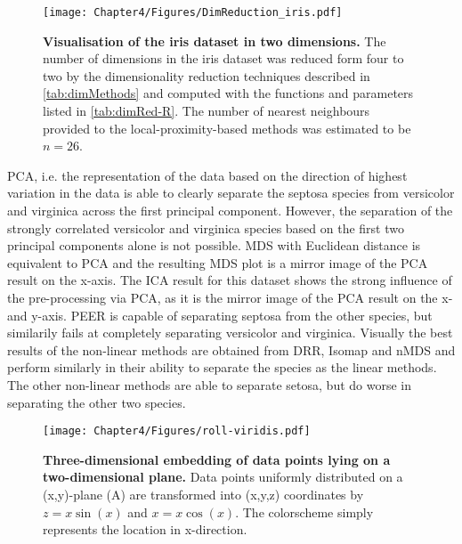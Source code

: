 \begin{figure}[h!]
	\centering
	\texttt{[image: Chapter4/Figures/DimReduction\_iris.pdf]}
	\caption[\textbf{Visualisation of the iris dataset in two dimensions.}]{\textbf{Visualisation of the iris dataset in two dimensions.} The number of dimensions in the iris dataset was reduced form four to two by the dimensionality reduction techniques described in \cref{tab:dimMethods} and computed with the functions and parameters listed in \cref{tab:dimRed-R}. The number of nearest neighbours provided to the local-proximity-based methods was estimated to be \(n=26\).} 
	 	\label{fig:dimRed-iris}
\end{figure}

PCA, i.e. the representation of the data based on the direction of highest variation in the data is able to clearly separate the septosa species from versicolor and virginica across the first principal component. However, the separation of the strongly correlated versicolor and virginica species based on the first two principal components alone is not possible. MDS with Euclidean distance is equivalent to PCA and the resulting MDS plot is a mirror image of the PCA result on the x-axis. The ICA result for this dataset shows the strong influence of the pre-processing via PCA, as it is the mirror image of the PCA result on the x- and y-axis. PEER is capable of separating septosa from the other species, but similarily fails at completely separating versicolor and virginica. 
Visually the best results of the non-linear methods are obtained from DRR, Isomap and nMDS and perform similarly in their ability to separate the species as the linear methods. The other non-linear methods are able to separate setosa, but do worse in separating the other two species.


\begin{figure}[p]
	\centering
	\texttt{[image: Chapter4/Figures/roll-viridis.pdf]}\\
	\caption[\textbf{Three-dimensional embedding of datapoints lying on a two-dimensional plane.} Generated via R function \textit{plot3D::scatter3D}]{\textbf{Three-dimensional embedding of data points lying on a two-dimensional plane.} Data points uniformly distributed on a (x,y)-plane (A) are transformed into (x,y,z) coordinates by \(z = x \sin(x)\) and \(x = x \cos(x)\). The colorscheme simply represents the location in x-direction.}
 	\label{fig:roll}
\end{figure}

